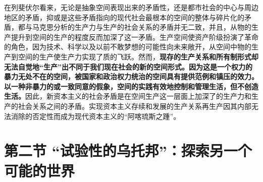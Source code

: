 \documentclass[UTF8, fontset = sourcesans, a4paper, oneside, zihao =
-4, scheme=chinese, no-math, space=true]{ctexbook}
\begin{document}
在列斐伏尔看来，无论是抽象空间表现出来的矛盾性，还是都市社会的中心与周边地区的矛盾，抑或是这些矛盾指向的现代社会最根本的空间的整体与碎片化的矛盾，都与马克思分析的生产力与生产的社会关系的矛盾并无二致，并且，从物的生产提升到空间的生产的程度反而加深了这一矛盾。生产空间使资产阶级扮演了革命的角色，因为技术、科学以及以前不敢梦想的可能性向未来敞开，从空间中物的生产到空间的生产使生产力实现了质的飞跃。然而，\textbf{现存的生产关系和所有制形式却无法自觉地``生产''出不同于我们现在社会的新的空间形式。因为这是一个权力的暴力无处不在的空间，被国家和政治权力统治的空间具有提供范例和镇压的效力。以一种非暴力的或一致同意的假象，空间的实践有效地控制和管理生活，但不创造生活。}因此，新资本主义的社会矛盾是在空间生产这一层面上加深了的生产力和生产的社会关系之间的矛盾。实现资本主义存续和发展的生产关系再生产因其内部无法消除的否定性而成为现代资本主义的``阿喀琉斯之踵''。

\protect\hypertarget{part0008_split_002.html}{}{}

\hypertarget{part0008_split_002.htmlux5cux23b012}{\section{\texorpdfstring{第二节
``试验性的乌托邦''：探索另一个可能的世界}{第二节 试验性的乌托邦：探索另一个可能的世界}}\label{part0008_split_002.htmlux5cux23b012}}
\end{document}
